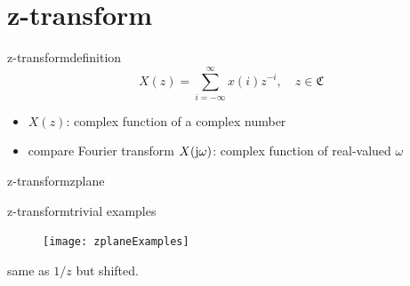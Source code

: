 \section{z-transform}
	\begin{frame}{z-transform}{definition}
        \begin{equation*}
            X(z) = \sum\limits_{i=-\infty}^{\infty}{x(i)z^{-i}},\quad z\in \mathfrak{C}
        \end{equation*}
        \begin{itemize}
            \item<2->   $X(z)$: complex function of a complex number
            \item<3->   compare Fourier transform $X(\mathrm{j}\omega)$: complex function of real-valued $\omega$
        \end{itemize}
	\end{frame}
	\begin{frame}{z-transform}{zplane}
        \vspace{-3mm}
	\end{frame}
	\begin{frame}{z-transform}{trivial examples}
        \vspace{-3mm}
        \begin{figure}
            \texttt{[image: zplaneExamples]}
        \end{figure}
        
        
        same as $1/z$ but shifted.
        
	\end{frame}
